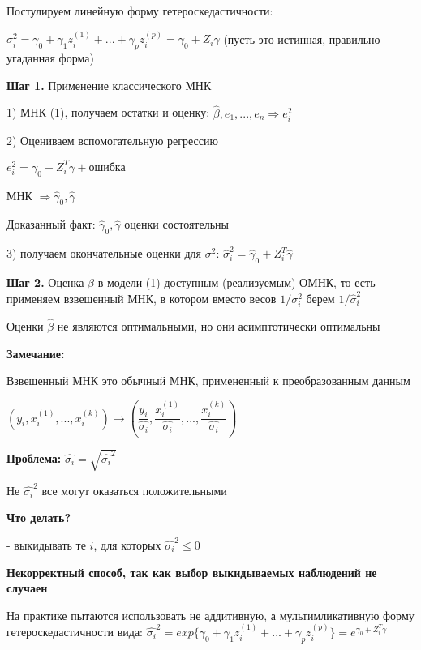 \documentclass{article}
\begin{document}
Постулируем линейную форму гетероскедастичности:\par
$\sigma^2_i = \gamma_0 + \gamma_1z_i^{(1)} + ... + \gamma_pz_i^{(p)} = \gamma_0 + Z_i\gamma$
(пусть это истинная, правильно угаданная форма)

\vspace{2mm}
\textbf{Шаг 1.} Применение классического МНК\par
1) МНК (1), получаем остатки и оценку: $\hat{\beta}, e_1, ... , e_n \Longrightarrow e^2_i$ \par
2) Оцениваем вспомогательную регрессию\par
$e_i^2 = \gamma_0 + Z_i^T\gamma + \text{ошибка}$\par
МНК $\Longrightarrow \hat{\gamma}_0, \hat{\gamma}$\par
Доказанный факт: $ \hat{\gamma}_0, \hat{\gamma}$ оценки состоятельны\par
3) получаем окончательные оценки для $\sigma^2$: 
$\hat{\sigma}^2_i = \hat{\gamma}_0 + Z^T_i\hat{\gamma}$ 

\vspace{2mm}
\textbf{Шаг 2.} Оценка $\beta$ в модели (1) доступным (реализуемым) ОМНК, то есть применяем взвешенный МНК, в котором вместо весов $1/\sigma^2_i$ берем $1/\hat{\sigma}^2_i$\par
Оценки $\hat{\beta}$ не являются оптимальными, но они асимптотически оптимальны\par

\begin{tcolorbox}
\textbf{Замечание:} \par
Взвешенный МНК это обычный МНК, примененный к преобразованным данным \par 
$(y_i, x_i^{(1)}, ... , x_i^{(k)}) \longrightarrow (\dfrac{y_i}{\hat{\sigma_i}}, \dfrac{x_i^{(1)}}{\hat{\sigma_i}}, ... , \dfrac{x_i^{(k)}}{\hat{\sigma_i}})$
\end{tcolorbox}

\textbf{Проблема:} $\hat{\sigma_i} = \sqrt{\hat{\sigma_i}^2}$\par
Не $\hat{\sigma_i}^2$ все могут оказаться положительными\par
\textbf{Что делать?} \par
 - выкидывать те $i$, для которых $\hat{\sigma_i}^2 \leq 0$ \par
\textbf{Некорректный способ, так как выбор выкидываемых наблюдений не случаен}

\vspace{2mm}
На практике пытаются использовать не аддитивную, а мультимликативную форму гетероскедастичности вида:
$\hat{\sigma_i}^2 = exp\{\gamma_0 + \gamma_1z_i^{(1)} + ... + \gamma_pz_i^{(p)}\} = e^{\gamma_0 + Z^T_i\gamma}$
\end{document}
